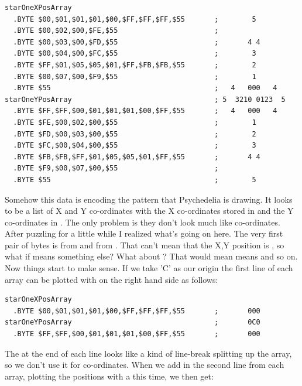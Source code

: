 \begin{lstlisting}[caption=Source code for the Star.]
starOneXPosArray  
  .BYTE $00,$01,$01,$01,$00,$FF,$FF,$FF,$55       ;        5       
  .BYTE $00,$02,$00,$FE,$55                       ;                
  .BYTE $00,$03,$00,$FD,$55                       ;       4 4      
  .BYTE $00,$04,$00,$FC,$55                       ;        3       
  .BYTE $FF,$01,$05,$05,$01,$FF,$FB,$FB,$55       ;        2       
  .BYTE $00,$07,$00,$F9,$55                       ;        1       
  .BYTE $55                                       ;   4   000   4  
starOneYPosArray                                  ; 5  3210 0123  5  
  .BYTE $FF,$FF,$00,$01,$01,$01,$00,$FF,$55       ;   4   000   4  
  .BYTE $FE,$00,$02,$00,$55                       ;        1       
  .BYTE $FD,$00,$03,$00,$55                       ;        2       
  .BYTE $FC,$00,$04,$00,$55                       ;        3       
  .BYTE $FB,$FB,$FF,$01,$05,$05,$01,$FF,$55       ;       4 4      
  .BYTE $F9,$00,$07,$00,$55                       ;                
  .BYTE $55                                       ;        5       
\end{lstlisting}

Somehow this data is encoding the pattern that Psychedelia is drawing. It looks to be a list of X and Y 
co-ordinates with the X co-ordinates stored in  and the Y co-ordinates in
. The only problem is they don't look much like co-ordinates. After puzzling 
for a little while I realized what's going on here. The very first pair of bytes is  from
 and  from . That can't mean that the X,Y
position is , so what if  means something else? What about ? That
would mean  means  and so on. Now things start to make sense. If we take 'C' as our origin the first line of 
each array can be plotted with  on the right hand side as follows:

\begin{lstlisting}
starOneXPosArray  
  .BYTE $00,$01,$01,$01,$00,$FF,$FF,$FF,$55       ;       000      
starOneYPosArray                                  ;       0C0        
  .BYTE $FF,$FF,$00,$01,$01,$01,$00,$FF,$55       ;       000      
\end{lstlisting}

The  at the end of each line looks like a kind of line-break splitting up the array, so we don't use it for
co-ordinates. 
When we add in the second line from each array, plotting the positions with a  this time, we then get:


